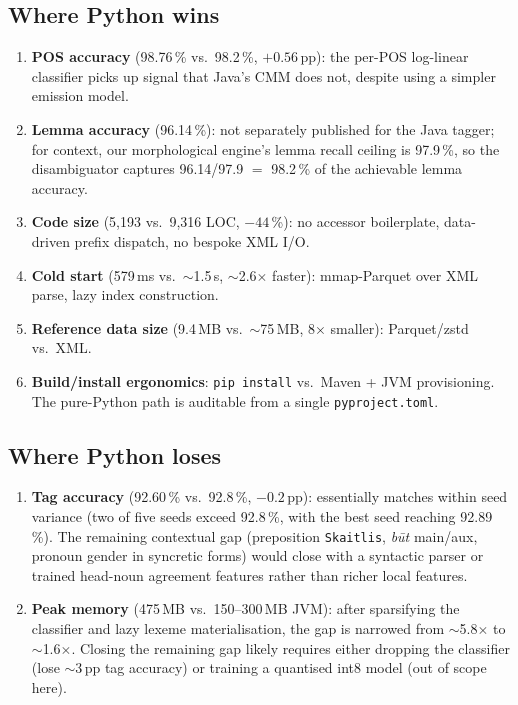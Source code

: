 \documentclass[11pt,a4paper]{article}
\begin{document}
\subsection{Where Python wins}

\begin{enumerate}
\item \textbf{POS accuracy} (98.76\,\% vs.\ 98.2\,\%, $+0.56$\,pp): the
  per-POS log-linear classifier picks up signal that Java's CMM does not,
  despite using a simpler emission model.
\item \textbf{Lemma accuracy} (96.14\,\%): not separately published for
  the Java tagger; for context, our morphological engine's lemma recall
  ceiling is 97.9\,\%, so the disambiguator captures 96.14/97.9 $=$ 98.2\,\%
  of the achievable lemma accuracy.
\item \textbf{Code size} (5{,}193 vs.\ 9{,}316 LOC, $-44$\,\%): no
  accessor boilerplate, data-driven prefix dispatch, no bespoke XML I/O.
\item \textbf{Cold start} (579\,ms vs.\ $\sim$1.5\,s, $\sim$2.6$\times$
  faster): mmap-Parquet over XML parse, lazy index construction.
\item \textbf{Reference data size} (9.4\,MB vs.\ $\sim$75\,MB,
  8$\times$ smaller): Parquet/zstd vs.\ XML.
\item \textbf{Build/install ergonomics}: \texttt{pip install} vs.\ Maven +
  JVM provisioning. The pure-Python path is auditable from a single
  \texttt{pyproject.toml}.
\end{enumerate}

\subsection{Where Python loses}

\begin{enumerate}
\item \textbf{Tag accuracy} (92.60\,\% vs.\ 92.8\,\%, $-0.2$\,pp): essentially
  matches within seed variance (two of five seeds exceed 92.8\,\%, with the
  best seed reaching 92.89\,\%). The remaining contextual gap
  (preposition \texttt{Skaitlis}, \textit{būt} main/aux, pronoun gender in
  syncretic forms) would close with a syntactic parser or trained
  head-noun agreement features rather than richer local features.
\item \textbf{Peak memory} (475\,MB vs.\ 150--300\,MB JVM): after sparsifying
  the classifier and lazy lexeme materialisation, the gap is narrowed from
  $\sim$5.8$\times$ to $\sim$1.6$\times$. Closing the remaining gap likely
  requires either dropping the classifier (lose $\sim$3\,pp tag accuracy)
  or training a quantised int8 model (out of scope here).
\end{enumerate}
\end{document}
